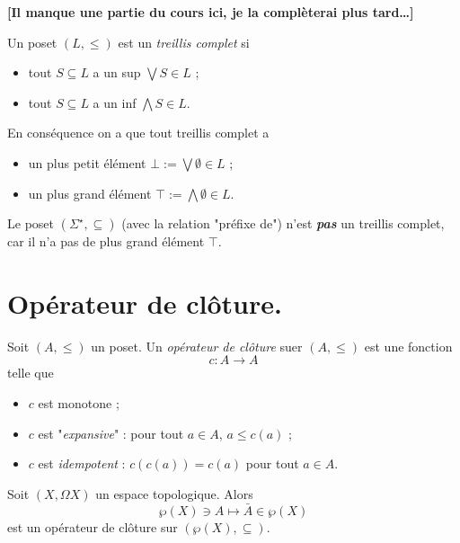 \documentclass[./main]{subfiles}
\begin{document}
  \textbf{[Il manque une partie du cours ici, je la complèterai plus tard\ldots]}

  \begin{defn}
    Un poset $(L, \le)$ est un \textit{treillis complet} si
    \begin{itemize}
      \item tout $S \subseteq L$ a un sup $\bigvee S \in L$ ;
      \item tout $S \subseteq L$ a un inf $\bigwedge S \in L$.
    \end{itemize}
  \end{defn}

  En conséquence on a que tout treillis complet a 
  \begin{itemize}
    \item un plus petit élément $\bot := \bigvee \emptyset \in L$ ;
    \item un plus grand élément $\top := \bigwedge \emptyset \in L$.
  \end{itemize}

  \begin{rmk}
    Le poset $(\Sigma^\star, \subseteq)$ (avec la relation "préfixe de") n'est \textit{\textbf{pas}} un treillis complet, car il n'a pas de plus grand élément $\top$.
  \end{rmk}

  \section{Opérateur de clôture.}

  \begin{defn}
    Soit $(A, \le)$ un poset.
    Un \textit{opérateur de clôture} suer $(A, \le)$ est une fonction
    \[
    c : A \to A
    \] 
    telle que
    \begin{itemize}
      \item $c$ est monotone ;
      \item $c$ est "\textit{expansive}" : pour tout $a \in A$, $a \le c(a)$ ;
      \item $c$ est \textit{idempotent} : $c(c(a)) = c(a)$ pour tout $a \in A$.
    \end{itemize}
  \end{defn}

  \begin{exm}
    Soit $(X, \Omega X)$ un espace topologique.
    Alors
    \[
    \wp(X) \ni A \mapsto \bar{A} \in \wp(X)
    \]
    est un opérateur de clôture sur $(\wp(X), \subseteq)$.
  \end{exm}
\end{document}
